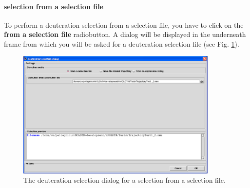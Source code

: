 \documentclass[a4paper,11pt]{report}
\begin{document}
\paragraph{selection from a selection file\\}
\label{deuteration_selection_from_a_selection_file}
To perform a deuteration selection from a selection file, you have to click on the \textbf{from a selection file} radiobutton. 
A dialog will be displayed in the underneath frame from which you will be asked for a deuteration selection file (see 
Fig. \ref{fig:deuteration_selection_from_a_selection_file}).
\newpage
\begin{figure}[h!]
\begin{center}
\includegraphics[width=10cm]{Figures/deuteration_selection_from_a_selection_file.eps}
\end{center}
\caption[The deuteration selection dialog for a selection from a selection file]{The deuteration selection dialog for a selection from a selection file.}
\label{fig:deuteration_selection_from_a_selection_file}
\end{figure}   
\end{document}
